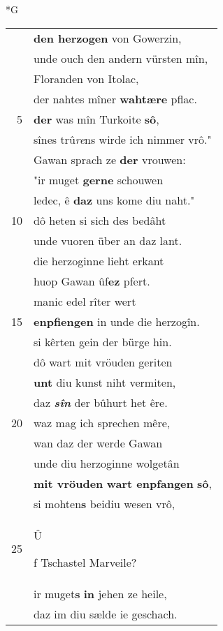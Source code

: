 \documentclass[8pt,a4paper,notitlepage]{article}
\begin{document}
\newpage
\begin{table}[ht]
\begin{minipage}[t]{0.5\linewidth}
\small
\begin{center}*G
\end{center}
\begin{tabular}{rl}
 & \textbf{den herzogen} von Gowerzin,\\ 
 & unde ouch den andern vürsten mîn,\\ 
 & Floranden von Itolac,\\ 
 & der nahtes mîner \textbf{wahtære} pflac.\\ 
5 & \textbf{der} was mîn Turkoite \textbf{sô},\\ 
 & sînes trû\textit{re}ns wirde ich nimmer vrô."\\ 
 & Gawan sprach ze \textbf{der} vrouwen:\\ 
 & "ir muget  \textbf{gerne} schouwen\\ 
 & ledec, ê \textbf{daz} uns kome diu naht."\\ 
10 & dô heten si sich des bedâht\\ 
 & unde vuoren über an daz lant.\\ 
 & die herzoginne lieht erkant\\ 
 & huop Gawan ûf\textbf{ez} pfert.\\ 
 & manic edel rîter wert\\ 
15 & \textbf{enpfiengen} in unde die herzogîn.\\ 
 & si kêrten gein der bürge hin.\\ 
 & dô wart mit vröuden geriten\\ 
 & \textbf{unt} diu kunst niht vermiten,\\ 
 & daz \textit{\textbf{sîn}} der bûhurt het êre.\\ 
20 & waz mag ich sprechen mêre,\\ 
 & wan daz der werde Gawan\\ 
 & unde diu herzoginne wolgetân\\ 
 & \textbf{mit vröuden} \textbf{wart enpfangen} \textbf{sô},\\ 
 & si mohten\textbf{s} beidiu wesen vrô,\\ 
25 & \begin{large}Û\end{large}f Tschastel Marveile?\\ 
 & ir muget\textbf{s} \textbf{in} jehen ze heile,\\ 
 & daz im diu sælde ie geschach.\\ 

\end{tabular}
\end{minipage}
\end{table}
\end{document}
